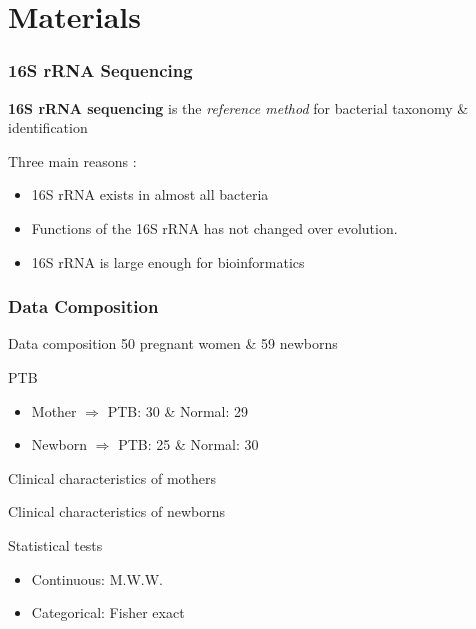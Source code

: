 \documentclass{beamer}
\begin{document}
    \section{Materials}
    \begin{frame}
        \frametitle{16S rRNA Sequencing}

        \textbf{16S rRNA sequencing} is the \textit{reference method} for bacterial taxonomy \& identification \cite{16S1}

        Three main reasons \cite{16S2}:
        \begin{itemize}
            \item 16S rRNA exists in almost all bacteria
            \item Functions of the 16S rRNA has not changed over evolution.
            \item 16S rRNA is large enough for bioinformatics
        \end{itemize}
    \end{frame}

    \begin{frame}[allowframebreaks]
        \frametitle{Data Composition}

        \begin{block}{Data composition}
            50 pregnant women \& 59 newborns
        \end{block}

        \begin{block}{PTB}
            \begin{itemize}
                \item Mother $\Rightarrow$ PTB: 30 \& Normal: 29
                \item Newborn $\Rightarrow$ PTB: 25 \& Normal: 30
            \end{itemize}
        \end{block}
        \pagebreak

        \begin{table}
            \centering
            \caption{Clinical characteristics of mothers}
            \resizebox{!}{\ifdimcomp{\height}{<}{0.35 \textheight}{\height}{0.35 \textheight}}
            {}
        \end{table}

        \begin{table}
            \centering
            \caption{Clinical characteristics of newborns}
            \resizebox{!}{\ifdimcomp{\height}{<}{0.25 \textheight}{\height}{0.25 \textheight}}
            {}
        \end{table}

        \begin{exampleblock}{Statistical tests}
            \begin{itemize}
                \item Continuous: M.W.W.
                \item Categorical: Fisher exact
            \end{itemize}
        \end{exampleblock}
    \end{frame}
\end{document}
